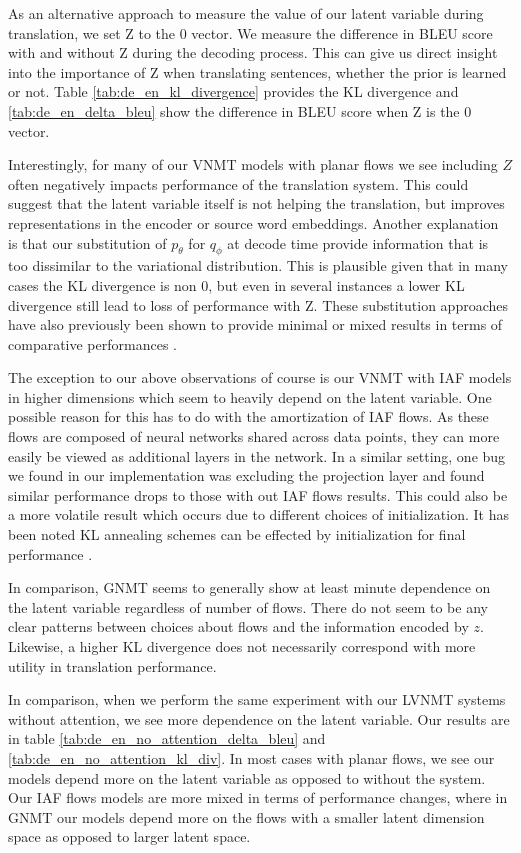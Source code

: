 As an alternative approach to measure the value of our latent variable during translation, we set Z to the 0 vector. We measure the difference in BLEU score with and without Z during the decoding process. This can give us direct insight into the importance of Z when translating sentences, whether the prior is learned or not. Table \ref{tab:de_en_kl_divergence} provides the KL divergence and \ref{tab:de_en_delta_bleu} show the difference in BLEU score when Z is the 0 vector. 

Interestingly, for many of our \ac{VNMT} models with planar flows we see including $Z$ often negatively impacts performance of the translation system. This could suggest that the latent variable itself is not helping the translation, but improves representations in the encoder or source word embeddings. Another explanation is that our substitution of $p_{\theta}$ for $q_{\phi}$ at decode time provide information that is too dissimilar to the variational distribution. This is plausible given that in many cases the KL divergence is non 0, but even in several instances a lower KL divergence still lead to loss of performance with Z. These substitution approaches have also previously been shown to provide minimal or mixed results in terms of comparative performances \cite{eikema2018AEVNMT}.

The exception to our above observations of course is our \ac{VNMT} with \ac{IAF} models in higher dimensions which seem to heavily depend on the latent variable. One possible reason for this has to do with the amortization of \ac{IAF} flows. As these flows are composed of neural networks shared across data points, they can more easily be viewed as additional layers in the network. In a similar setting, one bug we found in our implementation was excluding the projection layer and found similar performance drops to those with out IAF flows results. This could also be a more volatile result which occurs due to different choices of initialization. It has been noted KL annealing schemes can be effected by initialization for final performance \cite{sphericallatent2018Xu}.

In comparison, \ac{GNMT} seems to generally show at least minute dependence on the latent variable regardless of number of flows. There do not seem to be any clear patterns between choices about flows and the information encoded by $z$. Likewise, a higher KL divergence does not necessarily correspond with more utility in translation performance.  

In comparison, when we perform the same experiment with our \ac{LVNMT} systems without attention, we see more dependence on the latent variable. Our results are in table \ref{tab:de_en_no_attention_delta_bleu} and \ref{tab:de_en_no_attention_kl_div}. In most cases with planar flows, we see our models depend more on the latent variable as opposed to without the system. Our \ac{IAF} flows models are more mixed in terms of performance changes, where in \ac{GNMT} our models depend more on the flows with a smaller latent dimension space as opposed to larger latent space. 



